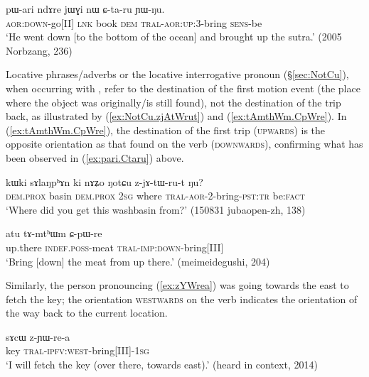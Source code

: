 \begin{exe}
\ex \label{ex:pari.Ctaru}
\gll  pɯ-ari ndɤre jɯɣi nɯ ɕ-ta-ru ɲɯ-ŋu. \\
\textsc{aor}:\textsc{down}-go[II] \textsc{lnk} book \textsc{dem} \textsc{tral}-\textsc{aor}:\textsc{up}:3\flobv{}-bring \textsc{sens}-be \\
\glt `He went down [to the bottom of the ocean] and brought up the sutra.' (2005 Norbzang, 236)
\end{exe}

Locative phrases/adverbs or the locative interrogative pronoun  (§\ref{sec:NotCu}), when occurring with , refer to the destination of the first motion event (the place where the object was originally/is still found), not the destination of the trip back, as illustrated by (\ref{ex:NotCu.zjAtWrut}) and (\ref{ex:tAmthWm.CpWre}). In (\ref{ex:tAmthWm.CpWre}), the destination of the first trip (\textsc{upwards}) is the opposite orientation as that found on the verb (\textsc{downwards}), confirming what has been observed in (\ref{ex:pari.Ctaru}) above.

\begin{exe}
\ex \label{ex:NotCu.zjAtWrut}
\gll kɯki sɤlaŋpʰɤn ki nɤʑo ŋotɕu z-jɤ-tɯ-ru-t ŋu? \\
\textsc{dem}.\textsc{prox} basin \textsc{dem}.\textsc{prox} \textsc{2sg} where \textsc{tral}-\textsc{aor}-2-bring-\textsc{pst}:\textsc{tr} be:\textsc{fact} \\
\glt `Where did you get this washbasin from?' (150831 jubaopen-zh, 138)
\end{exe}

\begin{exe}
\ex \label{ex:tAmthWm.CpWre}
\gll atu tɤ-mtʰɯm ɕ-pɯ-re \\
up.there \textsc{indef}.\textsc{poss}-meat \textsc{tral}-\textsc{imp}:\textsc{down}-bring[III] \\
\glt `Bring [down] the meat from up there.' (meimeidegushi, 204)
\end{exe}

Similarly, the person pronouncing (\ref{ex:zYWrea}) was going towards the east to fetch the key; the orientation \textsc{westwards} on the verb indicates the orientation of the way back to the current location.

\begin{exe}
\ex \label{ex:zYWrea}
\gll sɤcɯ z-ɲɯ-re-a \\
key \textsc{tral}-\textsc{ipfv}:\textsc{west}-bring[III]-\textsc{1sg} \\
\glt `I will fetch the key (over there, towards east).' (heard in context, 2014)
\end{exe}

